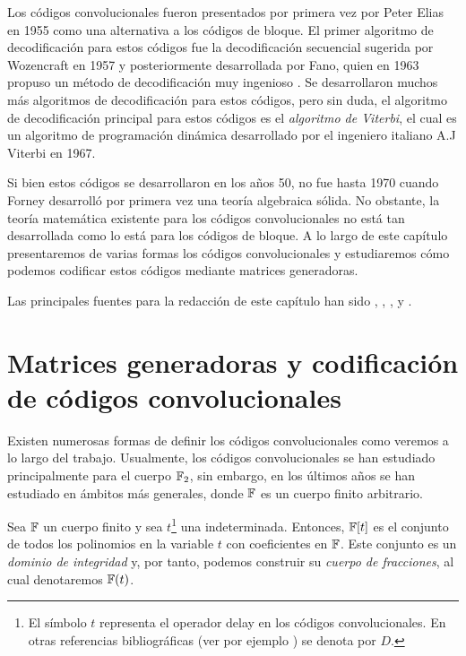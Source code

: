 Los códigos convolucionales fueron presentados por primera vez por Peter Elias  \cite{Elias1955} en 1955 como una alternativa a los códigos de bloque. El primer algoritmo de decodificación para estos códigos fue la decodificación secuencial sugerida por Wozencraft \cite{Wozencraft1957SequentialDF} en 1957 y posteriormente desarrollada por Fano, quien en 1963 propuso un método de decodificación muy ingenioso \cite{Fano1963}. Se desarrollaron muchos más algoritmos de decodificación para estos códigos, pero sin duda, el algoritmo de decodificación principal para estos códigos es el \emph{algoritmo de Viterbi}, el cual es un algoritmo de programación dinámica desarrollado por el ingeniero italiano A.J Viterbi \cite{Viterbi1967} en 1967.

Si bien estos códigos se desarrollaron en los años 50, no fue hasta 1970 cuando Forney \cite{Forney1970} desarrolló por primera vez una teoría algebraica sólida. No obstante, la teoría matemática existente para los códigos convolucionales no está tan desarrollada como lo está para los códigos de bloque. A lo largo de este capítulo presentaremos de varias formas los códigos convolucionales y estudiaremos cómo podemos codificar estos códigos mediante matrices generadoras.

Las principales fuentes para la redacción de este capítulo han sido \cite{Huffman_Pless_2010}, \cite{Forney1970}, \cite{Johannesson2015} , \cite{cccheide} y \cite{jl2020}.


\section{Matrices generadoras y codificación de códigos convolucionales}

Existen numerosas formas de definir los códigos convolucionales como veremos a lo largo del trabajo. Usualmente, los códigos convolucionales se han estudiado principalmente para el cuerpo $\mathbb{F} _2$, sin embargo, en los últimos años se han estudiado en ámbitos más generales, donde $\mathbb{F}$ es un cuerpo finito arbitrario.

Sea $\mathbb{F}$ un cuerpo finito y sea $t$\footnote{El símbolo $t$ representa el operador delay en los códigos convolucionales. En otras referencias bibliográficas (ver por ejemplo \cite{Huffman_Pless_2010}) se denota por $D$. } una indeterminada. Entonces, $\mathbb{F}[t]$ es el conjunto de todos los polinomios en la variable $t$ con coeficientes en $\mathbb{F}$. Este conjunto es un \emph{dominio de integridad} y, por tanto, podemos construir su \emph{cuerpo de fracciones}, al cual denotaremos $\mathbb{F}(t)$.

